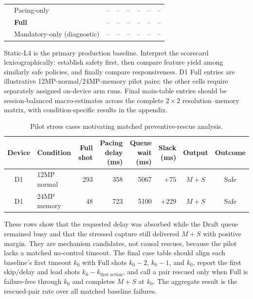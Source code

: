 \begin{table}[t]
{\begin{tabular}{@{}c l c c c c c c@{}}
      & Pacing-only & -- & -- & -- & -- & -- & -- \\
    \rowcolor{bgGray}
      & \textbf{Full} & -- & -- & -- & -- & -- & -- \\
      & Mandatory-only (diagnostic) & -- & -- & -- & -- & -- & -- \\
    \bottomrule
  \end{tabular}%
  }
  \par\vspace{3pt}
  {\footnotesize Static-L4 is the primary production baseline. Interpret the
  scorecard lexicographically: establish safety first, then compare feature
  yield among similarly safe policies, and finally compare responsiveness.
  D1 Full entries are illustrative 12MP-normal/24MP-memory pilot pairs; the
  other cells require separately assigned on-device arm runs. Final main-table
  entries should be session-balanced macro-estimates across the complete
  $2{\times}2$ resolution--memory matrix, with condition-specific results in
  the appendix.}
\end{table}

\begin{table}[t]
  \centering
  \caption{Pilot stress cases motivating matched preventive-rescue analysis.}
  \label{tab:preventive_intervention}
  {\small
  \setlength{\tabcolsep}{5.0pt}%
  \renewcommand{\arraystretch}{1.10}%
  \begin{tabular}{@{}c l r r r r c c@{}}
    \toprule
    \textbf{Device} & \textbf{Condition} & \textbf{Full shot} &
    \makecell{\textbf{Pacing}\\\textbf{delay (ms)}} &
    \makecell{\textbf{Queue wait}\\\textbf{(ms)}} &
    \makecell{\textbf{Slack}\\\textbf{(ms)}} &
    \textbf{Output} & \textbf{Outcome} \\
    \midrule
    D1 & 12MP normal & 293 & 358 & 5067 & $+75$ & $M{+}S$ & Safe \\
    D1 & 24MP memory & 48 & 723 & 5100 & $+229$ & $M{+}S$ & Safe \\
    \bottomrule
  \end{tabular}%
  }
  \par\vspace{3pt}
  {\footnotesize These rows show that the requested delay was absorbed while
  the Draft queue remained busy and that the stressed capture still delivered
  $M{+}S$ with positive margin. They are mechanism candidates, not causal
  rescues, because the pilot lacks a matched no-control timeout. The final case
  table should align each baseline's first timeout $k_0$ with Full shots
  $k_0-2$, $k_0-1$, and $k_0$, report the first skip/delay and lead shots
  $k_0-k_{\mathrm{first\ action}}$, and call a pair rescued only when Full is
  failure-free through $k_0$ and completes $M{+}S$ at $k_0$. The aggregate
  result is the rescued-pair rate over all matched baseline failures.}
\end{table}
